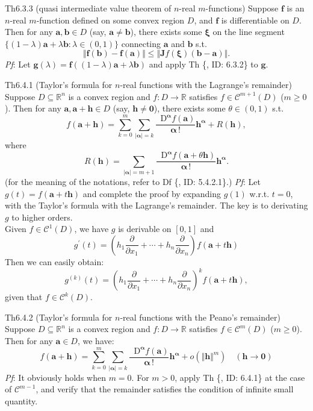 \documentclass{article}
\newcommand{\parfrac}[2]{\frac{\partial #1}{\partial #2}}
\newcommand{\Dif}{\mathop{}\!\mathrm{D}}
\begin{document}
\begin{Th}{Th6.3.3 (quasi intermediate value theorem of $n$-real $m$-functions)}
    Suppose $\pmb{f}$ is an $n$-real $m$-function defined on some convex region $D$, and $\pmb{f}$ is differentiable on $D$. Then for any $\pmb{a}, \pmb{b}\in D$ (say, $\pmb{a} \neq \pmb{b}$), there exists some $\pmb{\xi}$ on the line segment $\{(1-\lambda)\pmb{a}+\lambda\pmb{b}: \lambda\in (0,1)\}$ connecting $\pmb{a}$ and $\pmb{b}$ s.t.
    $$ \Vert \pmb{f}(\pmb{b}) - \pmb{f}(\pmb{a}) \Vert \leq \Vert \pmb{J}f(\pmb{\xi})(\pmb{b}-\pmb{a}) \Vert. $$
    \tcblower
    \textit{Pf}: Let $\pmb{g}(\lambda) = \pmb{f}\left((1-\lambda)\pmb{a}+\lambda\pmb{b}\right)$ and apply Th \{, ID: 6.3.2\} to $\pmb{g}$.
\end{Th}

\begin{Th}{Th6.4.1 (Taylor's formula for $n$-real functions with the Lagrange's remainder)}  
    Suppose $D\subseteq\mathbb{R}^n$ is a convex region and $f: D\rightarrow\mathbb{R}$ satisfies $f\in\mathcal{C}^{m+1}(D)$ ($m\geq 0$). Then for any $\pmb{a}, \pmb{a}+\pmb{h}\in D$ (say, $\pmb{h}\neq \pmb{0}$), there exists some $\theta\in (0,1)$ s.t.
    $$ f(\pmb{a}+\pmb{h}) = \sum_{k=0}^{m} \sum_{|\pmb{\alpha|} = k}\frac{\Dif^{\pmb{\alpha}} f(\pmb{a})}{\pmb{\alpha}\,!} \pmb{h}^{\pmb{\alpha}} + R(\pmb{h}), $$
    where 
    $$ R(\pmb{h}) = \sum_{|\pmb{\alpha}| = m+1} \frac{\Dif^{\pmb{\alpha}} f(\pmb{a}+\theta\pmb{h})}{\pmb{\alpha}\,!} \pmb{h}^{\pmb{\alpha}}. $$
    (for the meaning of the notations, refer to Df \{, ID: 5.4.2.1\}.)
    \tcblower
    \textit{Pf}: Let $g(t) = f(\pmb{a}+t\pmb{h})$ and complete the proof by expanding $g(1)$ w.r.t. $t=0$, with the Taylor's formula with the Lagrange's remainder. The key is to derivating $g$ to higher orders. \\
    Given $f\in\mathcal{C}^1(D)$, we have $g$ is derivable on $[0,1]$ and 
    $$ g^\prime (t) = \left(h_1\parfrac{}{x_1} + \cdots + h_n\parfrac{}{x_n}\right) f(\pmb{a}+t\pmb{h}) $$
    Then we can easily obtain:
    $$ g^{(k)}(t) = \left(h_1\parfrac{}{x_1} + \cdots + h_n\parfrac{}{x_n}\right)^k f(\pmb{a}+t\pmb{h}), $$
    given that $f\in\mathcal{C}^{k}(D)$. 
\end{Th}

\begin{Th}{Th6.4.2 (Taylor's formula for $n$-real functions with the Peano's remainder)}  
    Suppose $D\subseteq\mathbb{R}^n$ is a convex region and $f: D\rightarrow\mathbb{R}$ satisfies $f\in\mathcal{C}^{m}(D)$ ($m\geq 0$). Then for any $\pmb{a}\in D$, we have:
    $$ f(\pmb{a}+\pmb{h}) = \sum_{k=0}^{m} \sum_{|\pmb{\alpha}| = k}\frac{\Dif^{\pmb{\alpha}} f(\pmb{a})}{\pmb{\alpha}\,!} \pmb{h}^{\pmb{\alpha}} + o(\Vert \pmb{h}\Vert^m) \quad (\pmb{h}\rightarrow \pmb{0}) $$
    \tcblower
    \textit{Pf}: It obviously holds when $m=0$. For $m>0$, apply Th \{, ID: 6.4.1\} at the case of $\mathcal{C}^{m-1}$, and verify that the remainder satisfies the condition of infinite small quantity.
\end{Th}
\end{document}
